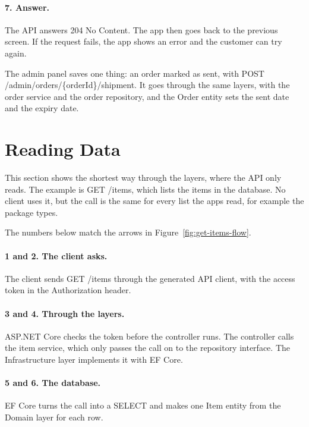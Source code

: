 \documentclass[a4paper,11pt]{article}
\begin{document}
\paragraph{7. Answer.} The API answers 204 No Content. The app then goes back to the previous screen. If the request fails, the app shows an error and the customer can try again.

The admin panel saves one thing: an order marked as sent, with POST /admin/orders/\{orderId\}/shipment. It goes through the same layers, with the order service and the order repository, and the Order entity sets the sent date and the expiry date.

\section{Reading Data}\label{sec:reading-data}
This section shows the shortest way through the layers, where the API only reads. The example is GET /items, which lists the items in the database. No client uses it, but the call is the same for every list the apps read, for example the package types.


The numbers below match the arrows in Figure~\ref{fig:get-items-flow}.

\paragraph{1 and 2. The client asks.} The client sends GET /items through the generated API client, with the access token in the Authorization header.

\paragraph{3 and 4. Through the layers.} ASP.NET Core checks the token before the controller runs. The controller calls the item service, which only passes the call on to the repository interface. The Infrastructure layer implements it with EF Core.

\paragraph{5 and 6. The database.} EF Core turns the call into a SELECT and makes one Item entity from the Domain layer for each row.
\end{document}
